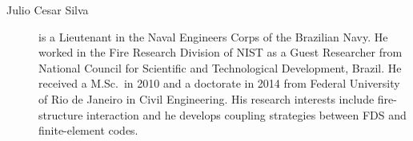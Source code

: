 \begin{description}



\item[Julio Cesar Silva] is a Lieutenant in the Naval Engineers Corps of the Brazilian Navy. He worked in the Fire Research Division of NIST as a Guest Researcher from National Council for Scientific and Technological Development, Brazil. He received a M.Sc.~in 2010 and a doctorate in 2014 from Federal University of Rio de Janeiro in Civil Engineering. His research interests include fire-structure interaction and he develops coupling strategies between FDS and finite-element codes.



\end{description}
